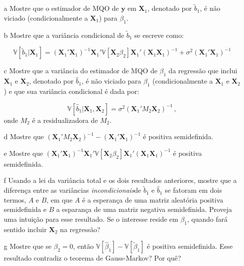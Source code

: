 \documentclass[10pt,a4paper]{article}
\begin{document}
 \begin{itemize}
 	\item[a] Mostre que o estimador de MQO de $\boldsymbol{y}$ em $\boldsymbol{X}_1$, denotado por $\tilde{b}_1$, é não viciado (condicionalmente a $\boldsymbol{X}_1$) para $\beta_1$.
 	\item[b] Mostre que a variância condicional de $\tilde{b}_1$ se escreve como:
 	
 	$$\mathbb{V}[\tilde{b}_1|\boldsymbol{X}_1] = 	(\boldsymbol{X}_1'\boldsymbol{X}_1)^{-1}\boldsymbol{X}_1'\mathbb{V}[\boldsymbol{X}_2\beta_2]\boldsymbol{X}_1'(\boldsymbol{X}_1\boldsymbol{X}_1)^{-1} + \sigma^2 (\boldsymbol{X}_1'\boldsymbol{X}_1)^{-1}$$
 	
 	\item[c] Mostre que a variância do estimador de MQO de $\beta_1$ da regressão que inclui $\boldsymbol{X}_1$ e $\boldsymbol{X}_2$, denotado por $\hat{b}_1$, é não viciado para $\beta_1$ (condicionalmente a $\boldsymbol{X}_1$ e $\boldsymbol{X}_2$) e que sua variância condicional é dada por:
 	
 	$$\mathbb{V}[\hat{b}_1|\boldsymbol{X}_1,\boldsymbol{X}_2] = \sigma^2\left(\boldsymbol{X}_1'M_2 \boldsymbol{X}_2\right)^{-1}\, , $$
 	onde $M_2$ é a residualizadora de $M_2$.
 	
 	\item[d] Mostre que $\left(\boldsymbol{X}_1'M_2 \boldsymbol{X}_2\right)^{-1} - (\boldsymbol{X}_1'\boldsymbol{X}_1)^{-1}$ é positiva semidefinida.
 	
 	\item[e] Mostre que $(\boldsymbol{X}_1'\boldsymbol{X}_1)^{-1}\boldsymbol{X}_1'\mathbb{V}[\boldsymbol{X}_2\beta_2]\boldsymbol{X}_1'(\boldsymbol{X}_1\boldsymbol{X}_1)^{-1} $ é positiva semidefinida.
 	
 	\item[f] Usando a  lei da variância total e os dois resultados anteriores, mostre que a diferença entre as variâncias \emph{incondicionais}de $\tilde{b}_1$ e $\hat{b}_1$ se fatoram em dois termos, $A$ e $B$, em que $A$ é a esperança de uma matriz aleatória positiva semidefinida e $B$ a esparança de uma matriz negativa semidefinida. Proveja uma intuição para esse resultado. Se o interesse reside em $\beta_1$, quando fará sentido incluir $\boldsymbol{X}_2$ na regressão?
 	\item[g] Mostre que se $\beta_2 = 0$, então  $\mathbb{V}[\hat{\beta}_1] - \mathbb{V}[\tilde{\beta}_1] $ é positiva semidefinida. Esse resultado contradiz o teorema de Gauss-Markov? Por quê?
 \end{itemize}
 
\end{document}
